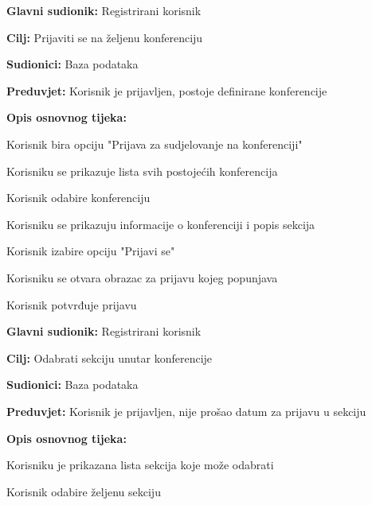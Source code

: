 	\noindent {}
	\begin{packed_item}
		
		\item \textbf{Glavni sudionik: }Registrirani korisnik
		\item  \textbf{Cilj:} Prijaviti se na željenu konferenciju
		\item  \textbf{Sudionici:} Baza podataka
		\item  \textbf{Preduvjet:} Korisnik je prijavljen, postoje definirane konferencije
		\item  \textbf{Opis osnovnog tijeka:}
		
		\item[] \begin{packed_enum}
			
			\item  Korisnik bira opciju "Prijava za sudjelovanje na konferenciji"
			\item Korisniku se prikazuje lista svih postojećih konferencija
			\item Korisnik odabire konferenciju
			\item Korisniku se prikazuju informacije o konferenciji i popis sekcija
			\item Korisnik izabire opciju "Prijavi se"
			\item Korisniku se otvara obrazac za prijavu kojeg popunjava
			\item Korisnik potvrđuje prijavu
			
		\end{packed_enum}
	\end{packed_item}

	\noindent \underbar{\textbf{UC4.1 - Odabir sekcije}}
	\begin{packed_item}
		
		\item \textbf{Glavni sudionik: }Registrirani korisnik
		\item  \textbf{Cilj:} Odabrati sekciju unutar konferencije
		\item  \textbf{Sudionici:} Baza podataka
		\item  \textbf{Preduvjet:} Korisnik je prijavljen, nije prošao datum za prijavu u sekciju
		\item  \textbf{Opis osnovnog tijeka:}
		
		\item[] \begin{packed_enum}
			
			\item  Korisniku je prikazana lista sekcija koje može odabrati
			\item Korisnik odabire željenu sekciju
			
		\end{packed_enum}
	\end{packed_item}

